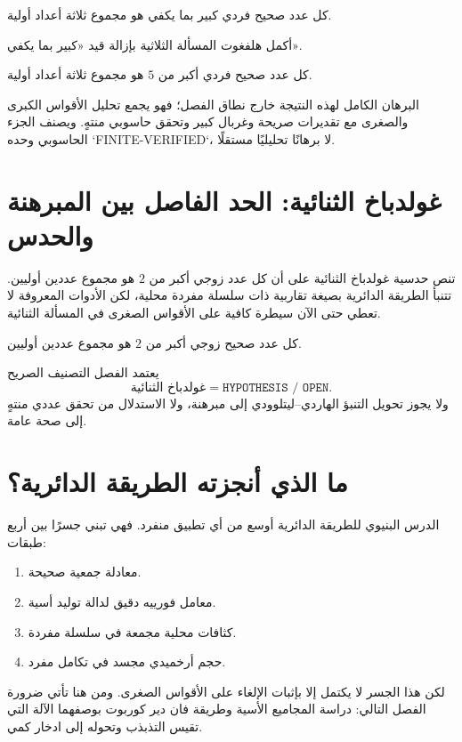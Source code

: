 \begin{theorem}
كل عدد صحيح فردي كبير بما يكفي هو مجموع ثلاثة أعداد أولية.
\end{theorem}

أكمل هلفغوت المسألة الثلاثية بإزالة قيد «كبير بما يكفي».

\begin{theorem}
كل عدد صحيح فردي أكبر من $5$ هو مجموع ثلاثة أعداد أولية.
\end{theorem}

البرهان الكامل لهذه النتيجة خارج نطاق الفصل؛ فهو يجمع تحليل الأقواس الكبرى والصغرى مع تقديرات صريحة وغربال كبير وتحقق حاسوبي منتهٍ. ويصنف الجزء الحاسوبي وحده `FINITE-VERIFIED`، لا برهانًا تحليليًا مستقلًا.

\section{غولدباخ الثنائية: الحد الفاصل بين المبرهنة والحدس}

تنص حدسية غولدباخ الثنائية على أن كل عدد زوجي أكبر من $2$ هو مجموع عددين أوليين. تتنبأ الطريقة الدائرية بصيغة تقاربية ذات سلسلة مفردة محلية، لكن الأدوات المعروفة لا تعطي حتى الآن سيطرة كافية على الأقواس الصغرى في المسألة الثنائية.

\begin{definition}
كل عدد صحيح زوجي أكبر من $2$ هو مجموع عددين أوليين.
\end{definition}

يعتمد الفصل التصنيف الصريح
\[
\text{غولدباخ الثنائية}=\texttt{HYPOTHESIS / OPEN}.
\]
ولا يجوز تحويل التنبؤ الهاردي--ليتلوودي إلى مبرهنة، ولا الاستدلال من تحقق عددي منتهٍ إلى صحة عامة.

\section{ما الذي أنجزته الطريقة الدائرية؟}

الدرس البنيوي للطريقة الدائرية أوسع من أي تطبيق منفرد. فهي تبني جسرًا بين أربع طبقات:
\begin{enumerate}
\item معادلة جمعية صحيحة.
\item معامل فورييه دقيق لدالة توليد أسية.
\item كثافات محلية مجمعة في سلسلة مفردة.
\item حجم أرخميدي مجسد في تكامل مفرد.
\end{enumerate}
لكن هذا الجسر لا يكتمل إلا بإثبات الإلغاء على الأقواس الصغرى. ومن هنا تأتي ضرورة الفصل التالي: دراسة المجاميع الأسية وطريقة فان دير كوربوت بوصفهما الآلة التي تقيس التذبذب وتحوله إلى ادخار كمي.

